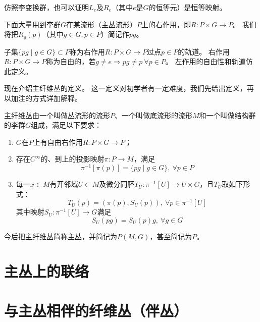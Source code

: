 \begin{note}
    仿照李变换群，也可以证明$L_e$及$R_e$（其中$e$是$G$的恒等元）是恒等映射。
\end{note}

下面大量用到李群$G$在某流形（主丛流形）$P$上的右作用，即$R \colon P \times G \to P$。
我们将把$R_g(p)$（其中$g \in G, p \in P$）简记作$pg$。

\begin{definition}
    子集$\{pg \mid g \in G\} \subset P$称为右作用$R \colon P \times G \to P$过点$p \in P$的轨道。
    右作用$R \colon P \times G \to P$称为自由的，若$g \neq e \Rightarrow pg \neq p ~ \forall p \in P$。
    左作用的自由性和轨道仿此定义。
\end{definition}

现在介绍主纤维丛的定义。
这一定义对初学者有一定难度，我们先给出定义，再以加注的方式详加解释。

\begin{definition}
    主纤维丛由一个叫做丛流形的流形$P$、一个叫做底流形的流形$M$和一个叫做结构群的李群$G$组成，满足以下要求：
    \begin{enumerate}[（a）]
        \item $G$在$P$上有自由右作用$R \colon P \times G \to P$；
        \item 存在$C^\infty$的、到上的投影映射$\pi \colon P \to M$，满足
        $$\pi^{-1}[\pi(p)] = \{pg \mid g \in G\}, ~ \forall p \in P$$
        \item 每一$x \in M$有开邻域$U \subset M$及微分同胚$T_U \colon \pi^{-1}[U] \to U \times G$，且$T_U$取如下形式：
        $$T_U(p) = (\pi(p), S_U(p)), ~ \forall p \in \pi^{-1}[U]$$
        其中映射$S_U \colon \pi^{-1}[U] \to G$满足
        $$S_U(pg) = S_U(p)g, ~ \forall g \in G$$
    \end{enumerate}
\end{definition}

\begin{note}
    今后把主纤维丛简称主丛，并简记为$P(M, G)$，甚至简记为$P$。
\end{note}

\section{主丛上的联络}

\section{与主丛相伴的纤维丛（伴丛）}

